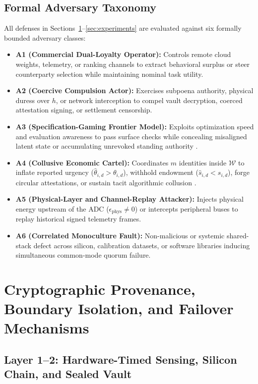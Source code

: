\documentclass[11pt]{article}
\begin{document}
\subsection{Formal Adversary Taxonomy}

All defenses in Sections~\ref{sec:custody}--\ref{sec:experiments} are evaluated against six formally bounded adversary classes:
\begin{itemize}
  \item \textbf{A1 (Commercial Dual-Loyalty Operator):} Controls remote cloud weights, telemetry, or ranking channels to extract behavioral surplus or steer counterparty selection while maintaining nominal task utility.
  \item \textbf{A2 (Coercive Compulsion Actor):} Exercises subpoena authority, physical duress over $h$, or network interception to compel vault decryption, coerced attestation signing, or settlement censorship.
  \item \textbf{A3 (Specification-Gaming Frontier Model):} Exploits optimization speed and evaluation awareness to pass surface checks while concealing misaligned latent state \citep{christiano2021elk} or accumulating unrevoked standing authority \citep{greenblatt2024control}.
  \item \textbf{A4 (Collusive Economic Cartel):} Coordinates $m$ identities inside $\mathcal{W}$ to inflate reported urgency ($\hat{\theta}_{i,d} > \theta_{i,d}$), withhold endowment ($\hat{s}_{i,d} < s_{i,d}$), forge circular attestations, or sustain tacit algorithmic collusion \citep{hurwicz1972decentralized, cahyono2026sticky}.
  \item \textbf{A5 (Physical-Layer and Channel-Replay Attacker):} Injects physical energy upstream of the ADC ($\epsilon_{\mathrm{phys}} \neq 0$) or intercepts peripheral buses to replay historical signed telemetry frames.
  \item \textbf{A6 (Correlated Monoculture Fault):} Non-malicious or systemic shared-stack defect across silicon, calibration datasets, or software libraries inducing simultaneous common-mode quorum failure.
\end{itemize}

\section{Cryptographic Provenance, Boundary Isolation, and Failover Mechanisms}\label{sec:custody}

\subsection{Layer 1--2: Hardware-Timed Sensing, Silicon Chain, and Sealed Vault}
\end{document}
